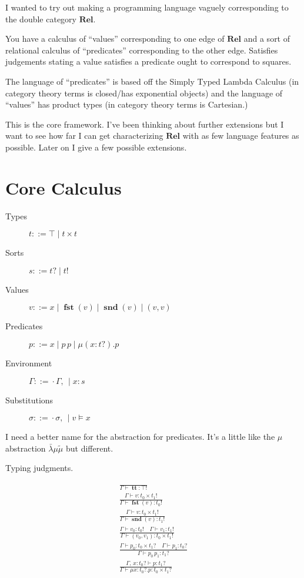 \documentclass[twocolumn, fleqn]{scrartcl}
\newcommand{\Rel}{\textbf{Rel}}
\newcommand{\bnfdef}{\mathbin{::=}}
\DeclareMathOperator{\coin}{\textbf{tt}}
\DeclareMathOperator{\fst}{\textbf{fst}}
\DeclareMathOperator{\snd}{\textbf{snd}}
\begin{document}
I wanted to try out making a programming language vaguely
corresponding to the double category \(\Rel\).

You have a calculus of ``values'' corresponding to one edge of
\(\Rel\) and a sort of relational calculus of ``predicates''
corresponding to the other edge. Satisfies judgements stating a value
satisfies a predicate ought to correspond to squares.

The language of ``predicates'' is based off the Simply Typed Lambda
Calculus (in category theory terms is closed/has exponential objects)
and the language of ``values'' has product types (in category theory
terms is Cartesian.)

This is the core framework.  I've been thinking about further
extensions but I want to see how far I can get characterizing
\(\Rel\) with as few language features as possible.  Later on I
give a few possible extensions.

\section*{Core Calculus}

\begin{description}
\item[Types] \( t \bnfdef \top \mid t \times t \)
\item[Sorts] \( s \bnfdef t ? \mid t ! \)
\item[Values] \( v \bnfdef x \mid \fst(v) \mid \snd(v) \mid ( v , v )  \)
\item[Predicates] \( p \bnfdef x \mid p \, p \mid \mu (x \colon t ?) . p \)
\item[Environment] \( \Gamma \bnfdef \cdot \Gamma , \, \mid x \colon s  \)
\item[Substitutions] \( \sigma \bnfdef \cdot \sigma , \, \mid v \models x  \)
\end{description}

I need a better name for the abstraction for predicates. It's a little
like the \(\mu\) abstraction \(\bar{\lambda} \mu \tilde{\mu}\) but
different.

Typing judgments.

\begin{multline*}
  \frac{
  }{
    \Gamma \vdash \coin \colon \top !
  }\\
  \frac{
    \Gamma \vdash v \colon t_0 \times t_1 !
  }{
    \Gamma \vdash \fst(v) \colon t_0 !
  }\\
  \frac{
    \Gamma \vdash v \colon t_0 \times t_1 !
  }{
    \Gamma \vdash \snd(v) \colon t_1 !
  }\\
  \frac{
    \Gamma \vdash v_0 \colon t_0 ! \quad
    \Gamma \vdash v_1 \colon t_1 !
  }{
    \Gamma \vdash ( v_0 , v_1 ) \colon t_0 \times t_1 !
  }\\
  \frac{
    \Gamma \vdash p_0 \colon t_0 \times t_1 ? \quad
    \Gamma \vdash p_1 \colon t_0 ?
  }{
    \Gamma \vdash p_0 \, p_1 \colon t_1 ?
  }\\
  \frac{
    \Gamma , \, x \colon t_0 ? \vdash p \colon t_1 ?
  }{
    \Gamma \vdash \mu x \colon t_0 ? . p \colon t_0 \times t_1 ?
  }\\
\end{multline*}
\end{document}
